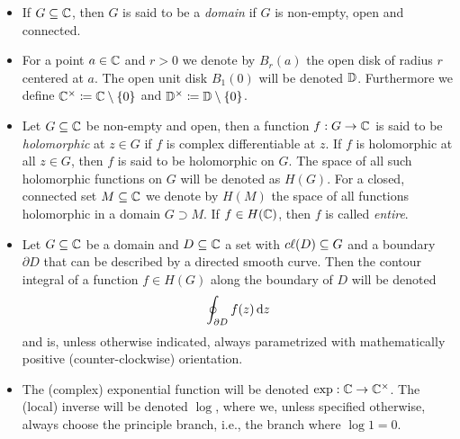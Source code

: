 \begin{itemize}[label=$\rightsquigarrow$]
    \item If $G \subseteq \mathbb{C}$, then $G$ is said to be a \emph{domain} if $G$ is non-empty, open and connected.
    \item For a point $a \in \mathbb{C}$ and $r > 0$ we denote by $B_r(a)$ the open disk of radius $r$ centered at $a$. The open unit disk $B_1(0)$ will be denoted $\mathbb{D}$. Furthermore we define $\mathbb{C}^\times \coloneqq \mathbb{C} \setminus \{ 0 \}$ and $\mathbb{D}^\times \coloneqq \mathbb{D} \setminus \{ 0 \}$.
    \item Let $G \subseteq \mathbb{C}$ be non-empty and open, then a function $f : G \to \mathbb{C}$ is said to be \emph{holomorphic} at $z \in G$ if $f$ is complex differentiable at $z$. If $f$ is holomorphic at all $z \in G$, then $f$ is said to be holomorphic on $G$. The space of all such holomorphic functions on $G$ will be denoted as $H(G)$. For a closed, connected set $M \subseteq \mathbb{C}$ we denote by $H(M)$ the space of all functions holomorphic in a domain $G \supset M$. If $f \in H(\mathbb{C})$, then $f$ is called \emph{entire}.
    \item Let $G \subseteq \mathbb{C}$ be a domain and $D \subseteq \mathbb{C}$ a set with $c\ell({D}) \subseteq G$ and a boundary $\partial D$ that can be described by a directed smooth curve. Then the contour integral of a function $f \in H(G)$ along the boundary of $D$ will be denoted
    $$ \oint_{\partial D} f(z) \mathop{}\!\mathrm{d} z $$
    and is, unless otherwise indicated, always parametrized with mathematically positive (counter-clockwise) orientation.
    \item The (complex) exponential function will be denoted $\exp : \mathbb{C} \to \mathbb{C}^\times$. The (local) inverse will be denoted $\log$, where we, unless specified otherwise, always choose the principle branch, i.e., the branch where $\log 1 = 0$.
\end{itemize}
